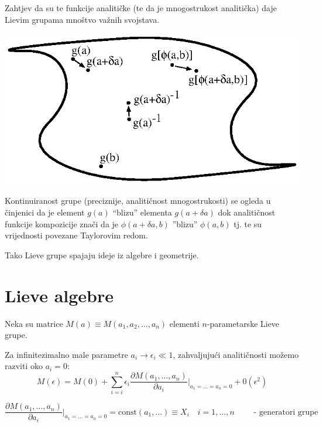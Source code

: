 Zahtjev da su te funkcije analitičke (te da je mnogostrukost
analitička) daje Lievim grupama mnoštvo važnih svojstava.


\centerline{\includegraphics[scale=1.0]{pics/lieva_mnogostrukost.eps}}

Kontinuiranost grupe (preciznije, analitičnost mnogostrukosti) se ogleda
u činjenici da je element $g(a)$ ``blizu'' elementa $g(a+\delta a)$ dok
analitičnost funkcije kompozicije znači da je $\phi(a+\delta a, b)$
''blizu'' $\phi(a,b)$ tj. te su vrijednosti povezane Taylorovim redom.

Tako Lieve grupe spajaju ideje iz algebre i geometrije.

\section{Lieve algebre}
\label{sec:lievealgebre}

Neka su matrice $M(a)\equiv M(a_1, a_2, \ldots, a_n)$ elementi $n$-parametarske
Lieve grupe.
 
Za infinitezimalno male parametre $a_i \to \epsilon_i \ll 1$, zahvaljujući
analitičnosti možemo razviti oko $a_i = 0$:
\begin{displaymath}
   M(\epsilon)=M(0)+ \sum_{i=i}^{n}\epsilon_i \frac{\partial M(a_1, \ldots, a_n)}
 {\partial a_i}\Bigg|_{a_1=\ldots =a_n=0} + 0(\epsilon^2)
\end{displaymath}


\begin{displaymath}
 \frac{\partial M(a_1, \ldots, a_n)}
 {\partial a_i}\Bigg|_{a_1=\ldots =a_n=0} = \textrm{const}(a_1, \ldots)
 \equiv  X_i  \quad i=1, \ldots, n \qquad \textrm{ - generatori grupe}
\end{displaymath}

